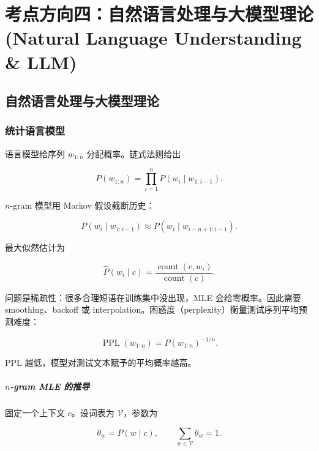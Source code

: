 \chapter{考点方向四：自然语言处理与大模型理论 (Natural Language Understanding \& LLM)}
\label{ch:nlu}

\section{自然语言处理与大模型理论}


\subsection{统计语言模型}


语言模型给序列 \(w_{1:n}\) 分配概率。链式法则给出

\[
  P(w_{1:n})
  =
  \prod_{i=1}^{n}P(w_i\mid w_{1:i-1}).
\]

\(n\)-gram 模型用 Markov 假设截断历史：

\[
  P(w_i\mid w_{1:i-1})
  \approx
  P(w_i\mid w_{i-n+1:i-1}).
\]

最大似然估计为

\[
  \widehat P(w_i\mid c)
  =
  \frac{\operatorname{count}(c,w_i)}
  {\operatorname{count}(c)}.
\]

问题是稀疏性：很多合理短语在训练集中没出现，MLE 会给零概率。因此需要 smoothing、backoff 或 interpolation。困惑度（perplexity）衡量测试序列平均预测难度：

\[
  \operatorname{PPL}(w_{1:n})
  =
  P(w_{1:n})^{-1/n}.
\]

PPL 越低，模型对测试文本赋予的平均概率越高。

\paragraph{\(n\)-gram MLE 的推导}

固定一个上下文 \(c\)。设词表为 \(\mathcal{V}\)，参数为

\[
  \theta_w=P(w\mid c),
  \qquad
  \sum_{w\in\mathcal{V}}\theta_w=1.
\]

